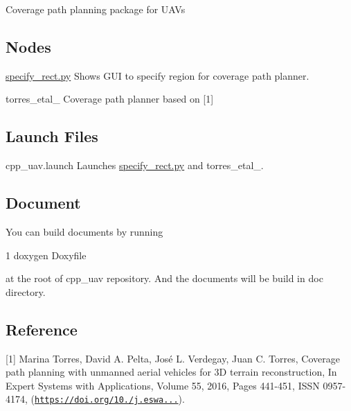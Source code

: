 Coverage path planning package for U\+A\+Vs

\subsection*{Nodes}


\begin{DoxyItemize}
\item \hyperlink{specify__rect_8py}{specify\+\_\+rect.\+py} Shows G\+UI to specify region for coverage path planner.
\item torres\+\_\+etal\+\_ Coverage path planner based on \mbox{[}1\mbox{]}
\end{DoxyItemize}

\subsection*{Launch Files}


\begin{DoxyItemize}
\item cpp\+\_\+uav.\+launch Launches \hyperlink{specify__rect_8py}{specify\+\_\+rect.\+py} and torres\+\_\+etal\+\_.
\end{DoxyItemize}

\subsection*{Document}

You can build documents by running 
\begin{DoxyCode}
1 doxygen Doxyfile
\end{DoxyCode}
 at the root of {\ttfamily cpp\+\_\+uav} repository. And the documents will be build in {\ttfamily doc} directory.

\subsection*{Reference}

\mbox{[}1\mbox{]} Marina Torres, David A. Pelta, José L. Verdegay, Juan C. Torres, Coverage path planning with unmanned aerial vehicles for 3D terrain reconstruction, In Expert Systems with Applications, Volume 55, 2016, Pages 441-\/451, I\+S\+SN 0957-\/4174, (\href{https://doi.org/10.1016/j.eswa.2016.02.007}{\tt https\+://doi.\+org/10./j.\+eswa...}). 